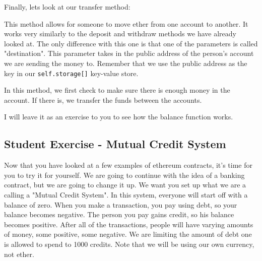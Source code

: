 \documentclass[12pt]{article}
\begin{document}
Finally, lets look at our transfer method:


This method allows for someone to move ether from one account to another. It works very similarly to the deposit and withdraw methods we have already looked at. The only difference with this one is that one of the parameters is called "destination". This parameter takes in the public address of the person's account we are sending the money to. Remember that we use the public address as the key in our \texttt{self.storage[]} key-value store. 

In this method, we first check to make sure there is enough money in the account. If there is, we transfer the funds between the accounts. 

I will leave it as an exercise to you to see how the balance function works.  

\subsection{Student Exercise - Mutual Credit System}
Now that you have looked at a few examples of ethereum contracts, it's time for you to try it for yourself. We are going to continue with the idea of a banking contract, but we are going to change it up. We want you set up what we are a calling a "Mutual Credit System". In this system, everyone will start off with a balance of zero. When you make a transaction, you pay using debt, so your balance becomes negative. The person you pay gains credit, so his balance becomes positive. After all of the transactions, people will have varying amounts of money, some positive, some negative. We are limiting the amount of debt one is allowed to spend to 1000 credits. Note that we will be using our own currency, not ether.
\end{document}
